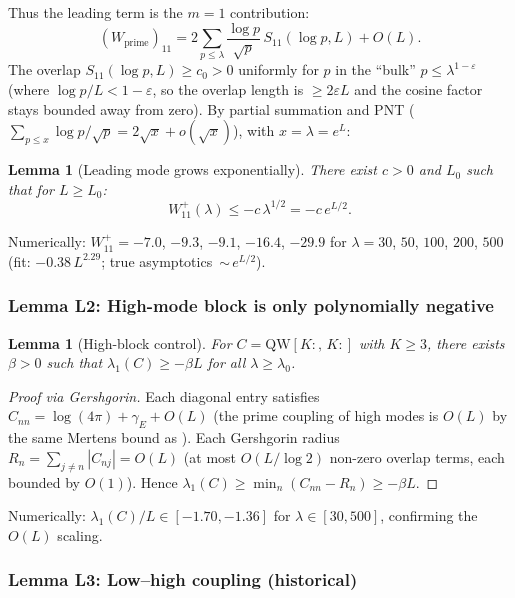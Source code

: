 \documentclass[12pt,a4paper]{article}
\newtheorem{lemma}[theorem]{Lemma}
\theoremstyle{definition}
\theoremstyle{remark}
\begin{document}
Thus the leading term is the $m = 1$ contribution:
\begin{equation}
\label{eq:W11-m1}
  (W_{\mathrm{prime}})_{11} = 2\sum_{p \leq \lambda} \frac{\log p}{\sqrt{p}}\,S_{11}(\log p, L) + O(L).
\end{equation}
The overlap $S_{11}(\log p, L) \geq c_0 > 0$ uniformly for $p$ in the ``bulk'' $p \leq \lambda^{1-\varepsilon}$ (where $\log p / L < 1 - \varepsilon$, so the overlap length is $\geq 2\varepsilon L$ and the cosine factor stays bounded away from zero). By partial summation and PNT ($\sum_{p \leq x} \log p / \sqrt{p} = 2\sqrt{x} + o(\sqrt{x})$), with $x = \lambda = e^L$:

\begin{lemma}[Leading mode grows exponentially]
\label{lem:L1}
There exist $c > 0$ and $L_0$ such that for $L \geq L_0$:
\[
  W_{11}^+(\lambda) \leq -c\,\lambda^{1/2} = -c\,e^{L/2}.
\]
\end{lemma}

\noindent Numerically: $W_{11}^+ = -7.0$, $-9.3$, $-9.1$, $-16.4$, $-29.9$ for $\lambda = 30$, $50$, $100$, $200$, $500$ (fit: $-0.38\,L^{2.29}$; true asymptotics~${\sim}\, e^{L/2}$).

\subsubsection{Lemma L2: High-mode block is only polynomially negative}

\begin{lemma}[High-block control]
\label{lem:L2}
For $C = \mathrm{QW}[K{:},\,K{:}]$ with $K \geq 3$, there exists $\beta > 0$ such that $\lambda_1(C) \geq -\beta L$ for all $\lambda \geq \lambda_0$.
\end{lemma}
\begin{proof}[Proof via Gershgorin]
Each diagonal entry satisfies $C_{nn} = \log(4\pi) + \gamma_E + O(L)$ (the prime coupling of high modes is $O(L)$ by the same Mertens bound as ). Each Gershgorin radius $R_n = \sum_{j \neq n} |C_{nj}| = O(L)$ (at most $O(L/\log 2)$ non-zero overlap terms, each bounded by $O(1)$). Hence $\lambda_1(C) \geq \min_n(C_{nn} - R_n) \geq -\beta L$.
\end{proof}

\noindent Numerically: $\lambda_1(C)/L \in [-1.70, -1.36]$ for $\lambda \in [30, 500]$, confirming the $O(L)$ scaling.

\subsubsection{Lemma L3: Low--high coupling (historical)}
\end{document}
